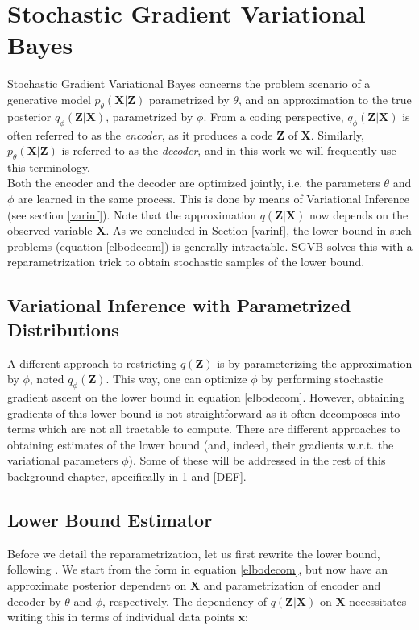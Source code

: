 \documentclass{report}
\begin{document}
\section{Stochastic Gradient Variational Bayes}\label{sgvb_section}



Stochastic Gradient Variational Bayes concerns the problem scenario of a generative model $p_\theta(\mathbf{X}|\mathbf{Z})$ parametrized by $\theta$, and an approximation to the true posterior $q_\phi(\mathbf{Z}|\mathbf{X})$, parametrized by $\phi$. From a coding perspective, $q_\phi(\mathbf{Z}|\mathbf{X})$ is often referred to as the \textit{encoder}, as it produces a code $\mathbf{Z}$ of $\mathbf{X}$. Similarly, $p_\theta(\mathbf{X}|\mathbf{Z})$ is referred to as the \textit{decoder}, and in this work we will frequently use this terminology. \\
Both the encoder and the decoder are optimized jointly, i.e. the parameters $\theta$ and $\phi$ are learned in the same process. This is done by means of Variational Inference (see section \ref{varinf}). Note that the approximation $q(\mathbf{Z}|\mathbf{X})$ now depends on the observed variable $\mathbf{X}$. As we concluded in Section \ref{varinf}, the lower bound in such problems (equation \ref{elbodecom}) is generally intractable. SGVB solves this with a reparametrization trick to obtain stochastic samples of the lower bound. 

\subsection{Variational Inference with Parametrized Distributions}\label{paramVI}
A different approach to restricting $q(\mathbf{Z})$ is by parameterizing the approximation by $\phi$, noted $q_\phi(\mathbf{Z})$. This way, one can optimize $\phi$ by performing stochastic gradient ascent on the lower bound in equation \ref{elbodecom}. However, obtaining gradients of this lower bound is not straightforward as it often decomposes into terms which are not all tractable to compute. There are different approaches to obtaining estimates of the lower bound (and, indeed, their gradients w.r.t. the variational parameters $\phi$). Some of these will be addressed in the rest of this background chapter, specifically in \ref{sgvb_section} and \ref{DEF}.


\subsection{Lower Bound Estimator}\label{sgvbest}
Before we detail the reparametrization, let us first rewrite the lower bound, following \cite{kingma2013auto}. We start from the form in equation \ref{elbodecom}, but now have an approximate posterior dependent on $\mathbf{X}$ and parametrization of encoder and decoder by $\theta$ and $\phi$, respectively. The dependency of $q(\mathbf{Z}|\mathbf{X})$ on $\mathbf{X}$ necessitates writing this in terms of individual data points $\mathbf{x}$:
\end{document}
